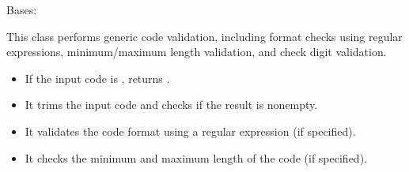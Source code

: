 \documentclass[letterpaper,10pt,english]{sphinxmanual}
\begin{document}
\begin{fulllineitems}
\label{\detokenize{apache_commons_validator_python.routines:apache_commons_validator_python.routines.code_validator.CodeValidator}}
\pysigstartsignatures
{}
\pysigstopsignatures
\sphinxAtStartPar
Bases: 

\sphinxAtStartPar
This class performs generic code validation, including format checks using
regular expressions, minimum/maximum length validation, and check digit validation.
\begin{description}
\begin{itemize}
\item {} 
\sphinxAtStartPar
If the input code is , returns .

\item {} 
\sphinxAtStartPar
It trims the input code and checks if the result is non\sphinxhyphen{}empty.

\item {} 
\sphinxAtStartPar
It validates the code format using a regular expression (if specified).

\item {} 
\sphinxAtStartPar
It checks the minimum and maximum length of the code (if specified).


\end{itemize}
\end{description}
\end{fulllineitems}
\end{document}
